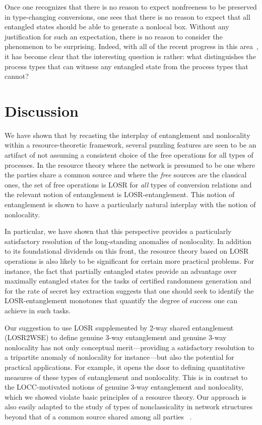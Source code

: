 \documentclass[prx,11pt,letterpaper,twocolumn,accepted=2023-11-27]{quantumarticle}
\theoremstyle{plain}
\theoremstyle{definition}
\begin{document}
Once one recognizes that there is no reason to expect nonfreeness to be preserved in type-changing conversions,
one sees that there is no reason to expect that all entangled states should be able to generate a nonlocal box.
 Without any justification for such an expectation, there is no reason to consider the phenomenon to be surprising. 
Indeed, with all of the recent progress in this area~\cite{gallego2014nonlocality,bowles2018device}, it has become clear that the interesting question is rather: what distinguishes the process types that can witness any entangled state from the process types that cannot?

\section{Discussion}\label{sec:Discussion}



  
 We have shown that by recasting the interplay of entanglement and nonlocality within a resource-theoretic framework,  several puzzling features 
 are seen to be an artifact of 
 not assuming a consistent choice of the free operations for all types of processes.   
 In the resource theory where the network is presumed to be one where the parties share a common source and where the {\em free} sources are the classical ones, the set of free operations is LOSR for {\em all} types of conversion relations and the relevant notion of entanglement is LOSR-entanglement.   This notion of entanglement is shown to have a particularly natural interplay with the notion of nonlocality.

In particular, we have shown that this perspective provides a particularly satisfactory resolution of the long-standing anomalies of nonlocality. 
   In addition to its foundational dividends on this front, the resource theory based on  LOSR operations is also likely to be significant for certain more practical problems.  For instance, the fact that partially entangled states provide an advantage over maximally entangled states for the tasks of certified randomness generation \cite{Acin2012randomnessvsnonlocality} and for the rate of secret key extraction \cite{Scarani2006QKD,Acin2006QKD} suggests that one should seek to identify the LOSR-entanglement monotones that quantify the degree of success one can achieve in such tasks.  


Our suggestion to use LOSR supplemented by 2-way shared entanglement (LOSR2WSE) to define genuine 3-way entanglement and genuine 3-way nonlocality has not only conceptual merit---providing a satisfactory resolution to a tripartite anomaly of nonlocality for instance---but also the potential for practical applications.  For example, it opens the door to defining quantitative measures of these types of entanglement and nonlocality. 
This is in contrast to the LOCC-motivated notions of genuine 3-way entanglement and nonlocality, which we showed violate basic principles of a resource theory.  Our approach is also easily adapted to the study of types of nonclassicality in network structures beyond that of a common source shared among all parties
 ~\cite{Henson2014,Fritz2012beyondBell,Wolfe2016inflation}.
\end{document}
